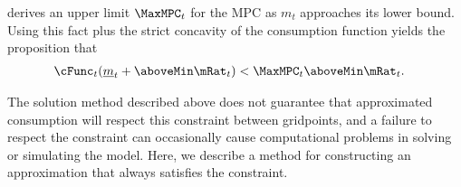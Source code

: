   \cite{BufferStockTheory} derives an upper limit  $\MaxMPC_{t}$ for the MPC as $m_{t}$
  approaches its lower bound.  Using this
  fact plus the strict concavity of the consumption function yields the
  proposition that
  \begin{equation}\begin{gathered}\begin{aligned}
    \cFunc_{t}(\ushort{m}_{t}+\aboveMin \mRat_{t}) & < \MaxMPC_{t} \aboveMin \mRat_{t}.
  \end{aligned}\end{gathered}\end{equation}

  The solution method described above does not guarantee that
  approximated consumption will respect this constraint between gridpoints, and a failure to
  respect the constraint can occasionally cause computational problems in solving
  or simulating the model.  Here, we
  describe a method for constructing an approximation that always
  satisfies the constraint.

  \begin{comment} %
    That is, the realist's consumption function is bounded from above by both
    the \textit{unconstrained} optimist's problem already treated, as well as
    by the \textit{constrained} optimist's problem, which is a 45 degree line
    originating from $\ushort{m}_{t}$ on the $m$-axis, as shown in
    Figure~\ref{fig:IntExpFOCInvPesReaOptNeed45Plot}. The same is true for
    the value function, as illustrated in Figure
    \ref{fig:IntExpFOCInvPesReaOptNeed45ValuePlot}.

    \hypertarget{IntExpFOCInvPesReaOptNeed45Plot}{}
    \begin{figure}
      \texttt{[image: ./Figures/IntExpFOCInvPesReaOptNeed45Plot]}
      \caption{45 Degree Line as Another Upper Bound}
      \label{fig:IntExpFOCInvPesReaOptNeed45Plot}
    \end{figure}

    \hypertarget{IntExpFOCInvPesReaOptNeed45ValuePlot}{}
    \begin{figure}
      \texttt{[image: ./Figures/IntExpFOCInvPesReaOptNeed45ValuePlot]}
      \caption{A Constrained Optimist's Value Function as Another Upper Bound}
      \label{fig:IntExpFOCInvPesReaOptNeed45ValuePlot}
    \end{figure}

  \end{comment}

  \newcommand{\mtCusp}{\ensuremath{\mRat_{t}^{\#}}}
